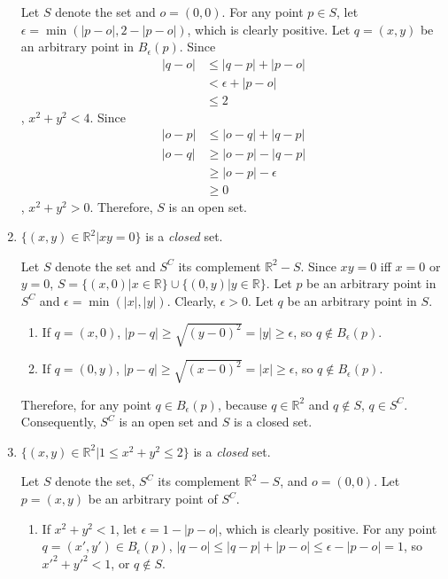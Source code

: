 \documentclass{homework}
\begin{document}
\begin{problem}{5}
\begin{enumerate}
Let $S$ denote the set and $o = (0, 0)$. For any point $p \in S$, let $\epsilon = \min(|p - o|, 2- |p - o|)$, which is clearly positive. Let $q = (x, y)$ be an arbitrary point in $B_{\epsilon}(p)$. Since
\begin{align*}
|q - o| &\leq |q - p| + |p - o| \\
        &<    \epsilon + |p - o| \\
        &\leq 2
\end{align*}
, $x^2 + y^2 < 4$. Since
\begin{align*}
|o - p| &\leq |o - q| + |q - p| \\
|o - q| &\geq |o - p| - |q - p| \\
        &\ge  |o - p| - \epsilon \\
        &\geq 0
\end{align*}
, $x^2 + y^2 > 0$. Therefore, $S$ is an open set. \QED

\item $\{(x, y) \in \mathbb{R}^2 | xy = 0\}$ is a \emph{closed} set.

Let $S$ denote the set and $S^C$ its complement $\mathbb{R}^2 - S$. Since $xy = 0$ iff $x = 0$ or $y = 0$, $S = \{(x,0) | x \in \mathbb{R}\} \cup \{(0, y) | y \in \mathbb{R}\}$. Let $p$ be an arbitrary point in $S^C$ and $\epsilon = \min(|x|, |y|)$. Clearly, $\epsilon > 0$. Let $q$ be an arbitrary point in $S$.

\begin{enumerate}
\item If $q = (x, 0)$, $|p - q| \geq \sqrt{(y - 0)^2} = |y| \geq \epsilon$, so $q \notin B_{\epsilon}(p)$.

\item If $q = (0, y)$, $|p - q| \geq \sqrt{(x - 0)^2} = |x| \geq \epsilon$, so $q \notin B_{\epsilon}(p)$.
\end{enumerate}

Therefore, for any point $q \in B_{\epsilon}(p)$, because $q \in \mathbb{R}^2$ and $q \notin S$, $q \in S^C$. Consequently, $S^C$ is an open set and $S$ is a closed set. \QED

\item $\{(x,y) \in \mathbb{R}^2 | 1 \leq x^2 + y^2 \leq 2\}$ is a \emph{closed} set.

Let $S$ denote the set, $S^C$ its complement $\mathbb{R}^2 - S$, and $o = (0, 0)$. Let $p = (x, y)$ be an arbitrary point of $S^C$.

\begin{enumerate}
\item If $x^2 + y^2 < 1$, let $\epsilon = 1 - |p - o|$, which is clearly positive. For any point $q = (x', y') \in B_{\epsilon}(p)$, $|q - o| \leq |q - p| + |p - o| \le \epsilon - |p - o| = 1$, so $x'^2 + y'^2 < 1$, or $q \notin S$.


\end{enumerate}
\end{enumerate}
\end{problem}
\end{document}
